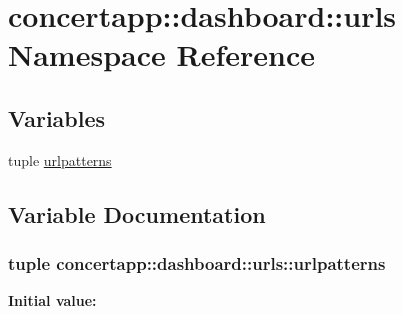 \hypertarget{namespaceconcertapp_1_1dashboard_1_1urls}{
\section{concertapp::dashboard::urls Namespace Reference}
\label{namespaceconcertapp_1_1dashboard_1_1urls}
}
\subsection*{Variables}
\begin{DoxyCompactItemize}
\item 
tuple \hyperlink{namespaceconcertapp_1_1dashboard_1_1urls_af215d641d30b49fc4cc31696036735b1}{urlpatterns}
\end{DoxyCompactItemize}


\subsection{Variable Documentation}
\hypertarget{namespaceconcertapp_1_1dashboard_1_1urls_af215d641d30b49fc4cc31696036735b1}{
\subsubsection[{urlpatterns}]{\setlength{\rightskip}{0pt plus 5cm}tuple {\bf concertapp::dashboard::urls::urlpatterns}}}
\label{namespaceconcertapp_1_1dashboard_1_1urls_af215d641d30b49fc4cc31696036735b1}
{\bfseries Initial value:}
